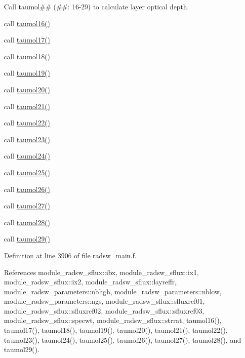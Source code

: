 \begin{DoxyItemize}
\item Call taumol\#\# (\#\#\+: 16-\/29) to calculate layer optical depth.
\begin{DoxyItemize}
\item call \hyperlink{group__module__radsw__main_ga8702f5f6285ff1a5cbfad740545fffb6}{taumol16()}
\item call \hyperlink{radsw__main_8f_ae46d1c061726bcde426caadd80b1fd80}{taumol17()}
\item call \hyperlink{radsw__main_8f_a06f6f2b0ef60df93c267a667a2e1aa36}{taumol18()}
\item call \hyperlink{radsw__main_8f_a776a0d78fda9f4fd0f1153b55be597df}{taumol19()}
\item call \hyperlink{radsw__main_8f_a6eb9a29728a986ea6b15240adebd4a0c}{taumol20()}
\item call \hyperlink{radsw__main_8f_a54619c48147f35da2d7855dc488c0ff4}{taumol21()}
\item call \hyperlink{radsw__main_8f_a3b5392346eee35eb13a2a54175b6338b}{taumol22()}
\item call \hyperlink{radsw__main_8f_adf5d73763c80ec079b72dda7d74cba94}{taumol23()}
\item call \hyperlink{radsw__main_8f_ae0abf1a08aa5d6ca14bfea83d0603716}{taumol24()}
\item call \hyperlink{radsw__main_8f_a21b72d6de9247eccb20de836ea76cf7a}{taumol25()}
\item call \hyperlink{radsw__main_8f_a20261640145a5d10e091ef3c67763175}{taumol26()}
\item call \hyperlink{radsw__main_8f_a7d2cea6cc0cfde853d25a14ba0efcca2}{taumol27()}
\item call \hyperlink{radsw__main_8f_a2113c76707f43cf91fe5926ab69d1b8b}{taumol28()}
\item call \hyperlink{radsw__main_8f_a08e2db10432d07392f29a49bc5b5c640}{taumol29()} 
\end{DoxyItemize}
\end{DoxyItemize}

Definition at line 3906 of file radsw\+\_\+main.\+f.



References module\+\_\+radsw\+\_\+sflux\+::ibx, module\+\_\+radsw\+\_\+sflux\+::ix1, module\+\_\+radsw\+\_\+sflux\+::ix2, module\+\_\+radsw\+\_\+sflux\+::layreffr, module\+\_\+radsw\+\_\+parameters\+::nbhgh, module\+\_\+radsw\+\_\+parameters\+::nblow, module\+\_\+radsw\+\_\+parameters\+::ngs, module\+\_\+radsw\+\_\+sflux\+::sfluxref01, module\+\_\+radsw\+\_\+sflux\+::sfluxref02, module\+\_\+radsw\+\_\+sflux\+::sfluxref03, module\+\_\+radsw\+\_\+sflux\+::specwt, module\+\_\+radsw\+\_\+sflux\+::strrat, taumol16(), taumol17(), taumol18(), taumol19(), taumol20(), taumol21(), taumol22(), taumol23(), taumol24(), taumol25(), taumol26(), taumol27(), taumol28(), and taumol29().



